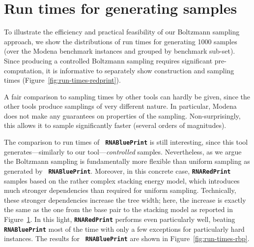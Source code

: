 \documentclass[10pt]{article}
\newcommand{\RNAblueprint}{{\tt \bfseries{}\color{black!85} RNA\textcolor{blue!70!black}{Blue}Print}}
\newcommand{\ourprog}{{\tt \bfseries{}\color{black!85}RNA\textcolor{red!70!black}{Red}Print}}
\newenvironment{revision}{\color{red}}{\color{black}}
\begin{document}
\begin{revision}
  \section{Run times for generating samples}

To illustrate the efficiency and practical feasibility of our Boltzmann sampling approach, we show the distributions of run times for generating 1000 samples (over the Modena benchmark instances and grouped by benchmark sub-set). Since producing a controlled Boltzmann sampling requires significant pre-computation, it is informative to separately show construction and sampling times (Figure~\ref{fig:run-times-redprint}). 


A fair comparison to sampling times by other tools can hardly be given, since the other tools produce samplings of very different nature. In particular, Modena does not make any guarantees on properties of the sampling. Non-surprisingly, this allows it to sample significantly faster (several orders of magnitudes).

The comparison to run times of \RNAblueprint{} is still interesting, since this tool generates---similarly to our tool---\emph{controlled} samples. Nevertheless, as we argue the Boltzmann sampling is fundamentally more flexible than uniform sampling as generated by \RNAblueprint. Moreover, in this concrete case, \ourprog{} samples based on the rather complex stacking energy model, which introduces much stronger dependencies than required for uniform sampling. Technically, these stronger dependencies increase the tree width; here, the increase is exactly the same as the one from the base pair to the stacking model as reported in Figure~\ref{}. In this light, \ourprog{} performs even particularly well, beating \RNAblueprint{} most of the time with only a few exceptions for particularly hard instances. The results for \RNAblueprint{} are shown in Figure~\ref{fig:run-times-rbp}. 


\end{revision}
\end{document}
